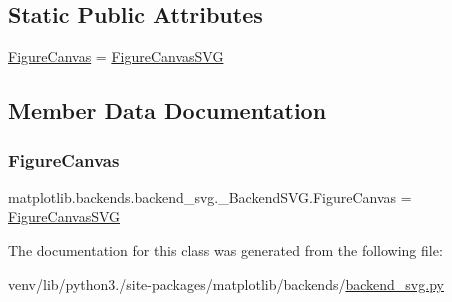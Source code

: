 \subsection*{Static Public Attributes}
\begin{DoxyCompactItemize}
\item 
\hyperlink{classmatplotlib_1_1backends_1_1backend__svg_1_1__BackendSVG_af82fc889c5516fe0969e70914054b65d}{Figure\+Canvas} = \hyperlink{classmatplotlib_1_1backends_1_1backend__svg_1_1FigureCanvasSVG}{Figure\+Canvas\+S\+VG}
\end{DoxyCompactItemize}


\subsection{Member Data Documentation}
\mbox{\label{classmatplotlib_1_1backends_1_1backend__svg_1_1__BackendSVG_af82fc889c5516fe0969e70914054b65d}} 
\subsubsection{\texorpdfstring{Figure\+Canvas}{FigureCanvas}}
{\footnotesize\ttfamily matplotlib.\+backends.\+backend\+\_\+svg.\+\_\+\+Backend\+S\+V\+G.\+Figure\+Canvas = \hyperlink{classmatplotlib_1_1backends_1_1backend__svg_1_1FigureCanvasSVG}{Figure\+Canvas\+S\+VG}\hspace{0.3cm}{\ttfamily [static]}}



The documentation for this class was generated from the following file\+:\begin{DoxyCompactItemize}
\item 
venv/lib/python3./site-\/packages/matplotlib/backends/\hyperlink{backend__svg_8py}{backend\+\_\+svg.\+py}\end{DoxyCompactItemize}
